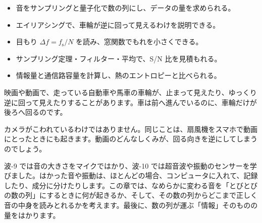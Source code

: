 \begin{goal}
\begin{itemize}[label={\color{bkTheme}●}, leftmargin=1.6\zw, itemsep=0pt, topsep=1pt]
\item {}\enspace 音をサンプリングと量子化で数の列にし、データの量を求められる。
\item {}\enspace エイリアシングで、車輪が逆に回って見えるわけを説明できる。
\item {}\enspace 目もり $\Delta f=f_{\mathrm s}/N$ を読み、窓関数でもれを小さくできる。
\item {}\enspace サンプリング定理・フィルター・平均で、S/N 比を見積もれる。
\item {}\enspace 情報量と通信路容量を計算し、熱のエントロピーと比べられる。
\end{itemize}
\end{goal}

\begin{hatena}
\noindent\begin{minipage}[c]{0.54\linewidth}\raggedright
映画や動画で、走っている自動車や馬車の車輪が、止まって見えたり、ゆっくり逆に回って見えたりすることがあります。車は前へ進んでいるのに、車輪だけが後ろへ回るのです。

カメラがこわれているわけではありません。同じことは、扇風機をスマホで動画にとったときにも起きます。動画のどんなしくみが、回る向きを逆にしてしまうのでしょう。
\end{minipage}\hfill
\begin{minipage}[c]{0.43\linewidth}\centering
{}
\end{minipage}
\end{hatena}

\noindent 波-9 では音の大きさをマイクではかり、波-10 では超音波や振動のセンサーを学びました。はかった音や振動は、ほとんどの場合、コンピュータに入れて、記録したり、成分に分けたりします。この章では、なめらかに変わる音を「とびとびの数の列」にするときに何が起きるか、そして、その数の列からどこまで正しく音の中身を読みとれるかを考えます。最後に、数の列が運ぶ「情報」そのものの量をはかります。

